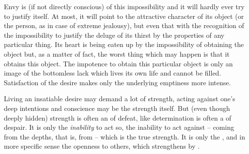 {  Envy is  (if not directly conscious) of this impossibility and it
  will hardly ever try to justify itself. At most, it will point to the
  attractive character of its object (or the person, as in case of extreme
  jealousy), but even that with the recognition of the impossibility to justify
  the deluge of its  thirst by the properties of any particular
  thing. Its heart is being eaten up by the impossibility of obtaining the
  object but, as a matter of fact, the worst thing which may happen is that it
  obtains this object. The impotence to obtain this particular object is only an
   image of the bottomless lack which lives its own life and cannot
  be filled. Satisfaction of the  desire makes only the underlying
  emptiness more intense.
  
  \pa Living an insatiable desire may demand a lot of strength, acting against
  one's deep intentions and conscience may be the strength itself. But
   (even though deeply hidden) strength is often an 
  of defeat, like determination is often a  of despair. It is only the
  {\em inability} to act so, the inability to act against  -- coming from the depths, that is, from  -- which
  is the true strength.  It is only the , and in more specific
  sense the openness to others, which strengthens by .
  
  
}
